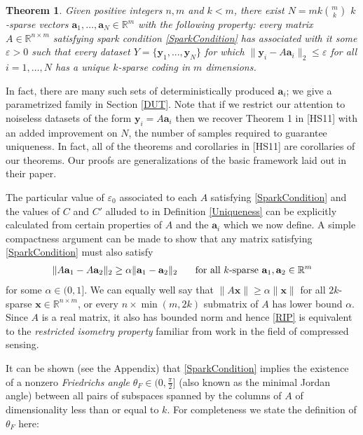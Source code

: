 \documentclass[journal, onecolumn]{IEEEtran}
\newtheorem{theorem}{Theorem}
\begin{document}

\begin{theorem}\label{DeterministicUniquenessTheorem}
Given positive integers $n, m$ and $k < m$, there exist $N =  mk{m \choose k}$ $k$-sparse vectors $\mathbf{a}_1, \ldots, \mathbf{a}_N \in \mathbb{R}^m$ with the following property: every matrix $A \in \mathbb{R}^{n \times m}$ satisfying spark condition \eqref{SparkCondition} has associated with it some $\varepsilon > 0$ such that every dataset $Y = \{ \mathbf{y}_1, ..., \mathbf{y}_N \}$ for which $\| \mathbf{y}_i - A\mathbf{a}_i \|_2 \leq \varepsilon$ for all $i = 1, \ldots, N$ has a unique $k$-sparse coding in $m$ dimensions. 
\end{theorem}

In fact, there are many such sets of deterministically produced $\mathbf{a}_i$; we give a parametrized family in Section \ref{DUT}. Note that if we restrict our attention to noiseless datasets of the form $\mathbf{y}_i = A\mathbf{a}_i$ then we recover Theorem 1 in [HS11] with an added improvement on $N$, the number of samples required to guarantee uniqueness. In fact, all of the theorems and corollaries in [HS11] are corollaries of our theorems. Our proofs are generalizations of the basic framework laid out in their paper.

The particular value of $\varepsilon_0$ associated to each $A$ satisfying \eqref{SparkCondition} and the values of $C$ and $C'$ alluded to in Definition \ref{Uniqueness} can be explicitly calculated from certain properties of $A$ and the $\mathbf{a}_i$ which we now define. A simple compactness argument can be made to show that any matrix satisfying \eqref{SparkCondition} must also satisfy
\begin{align}\label{RIP}
\|A\mathbf{a}_1 - A\mathbf{a}_2 \|_2 \geq  \alpha \|\mathbf{a}_1 - \mathbf{a}_2\|_2 \indent \text{ for all $k$-sparse } \mathbf{a}_1, \mathbf{a}_2 \in \mathbb{R}^m
\end{align}
%
for some $\alpha \in (0,1]$. We can equally well say that $\|A\mathbf{x}\| \geq \alpha\|\mathbf{x}\|$ for all $2k$-sparse $\mathbf{x} \in \mathbb{R}^{n \times m}$, or every $n \times \min(m,2k)$ submatrix of $A$ has lower bound $\alpha$. Since $A$ is a real matrix, it also has bounded norm and hence \eqref{RIP} is equivalent to the \emph{restricted isometry property} \cite{CandesTao05} familiar from work in the field of compressed sensing.

It can be shown (see the Appendix) that \eqref{SparkCondition} implies the existence of a nonzero \emph{Friedrichs angle} $\theta_F \in (0,\frac{\pi}{2}]$ (also known as the minimal Jordan angle) between all pairs of subspaces spanned by the columns of $A$ of dimensionality less than or equal to $k$. For completeness we state the definition of $\theta_F$ here:
\end{document}
